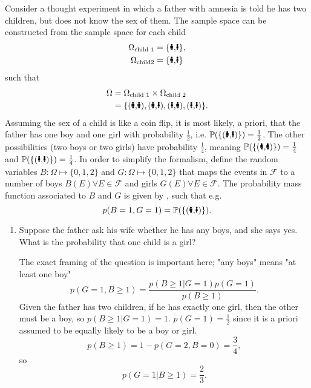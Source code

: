 \begin{example}
	Consider a thought experiment in which a father with amnesia is told he has two children, but does not know the sex of them. The sample space can be constructed from the sample space for each child
	\begin{equation}
		\begin{split}
			\Omega_{\text{child 1}} &= \{\text{\Gentsroom,\Ladiesroom}\},\\
			\Omega_{\text{child2}} &= \{\text{\Gentsroom,\Ladiesroom}\}\\
		\end{split}
	\end{equation}
	such that
	\begin{equation}
		\begin{split}
			\Omega &= \Omega_{\text{child 1}}\times \Omega_{\text{child 2}}\\
			&= \{(\text{\Gentsroom,\Gentsroom}),(\text{\Gentsroom,\Ladiesroom}),(\text{\Ladiesroom,\Gentsroom}),(\text{\Ladiesroom,\Ladiesroom})\}.
		\end{split}
	\end{equation}
	Assuming the sex of a child is like a coin flip, it is most likely, a priori, that the father has one boy and one girl with probability $\frac{1}{2}$, i.e.  $\mathbb{P}(\{(\text{\Gentsroom,\Ladiesroom})\})=\frac{1}{2}$. The other possibilities (two boys or two girls) have probability $\frac{1}{4}$, meaning $\mathbb{P}(\{(\text{\Gentsroom,\Gentsroom})\})=\frac{1}{4}$ and $\mathbb{P}(\{(\text{\Ladiesroom,\Ladiesroom})\})=\frac{1}{4}$. In order to simplify the formalism, define the random variables $B: \Omega \mapsto \{0,1,2\}$ and $G: \Omega \mapsto \{0,1,2\}$ that maps the events in $\mathcal{F}$ to a number of boys $B(E)\forall E\in \mathcal{F}$ and girls $G(E)\forall E\in \mathcal{F}$. The probability mass function associated to $B$ and $G$ is given by , such that e.g.
	\begin{equation}
		p(B = 1, G = 1)= \mathbb{P}(\{(\text{\Gentsroom,\Ladiesroom})\}).
	\end{equation}

	\begin{enumerate}
		\item Suppose the father ask his wife whether he has any boys, and she says yes. What is the probability that one child is a girl?
		
		The exact framing of the question is important here; "any boys" means "at least one boy"
		\begin{equation}
			p(G=1,B\geq 1) = \frac{p(B\geq1|G=1)p(G=1)}{p(B\geq 1)}.
		\end{equation}
		Given the father has two children, if he has exactly one girl, then the other must be a boy, so $p(B\geq 1|G=1)=1$. $p(G=1)=\frac{1}{2}$ since it is a priori assumed to be equally likely to be a boy or girl. 
		\begin{equation}
			p(B\geq 1)=1-p(G=2,B=0)=\frac{3}{4},
		\end{equation}
		so
		\begin{equation}
			p(G=1|B\geq 1) = \frac{2}{3}.
		\end{equation}
		

\end{enumerate}
\end{example}
